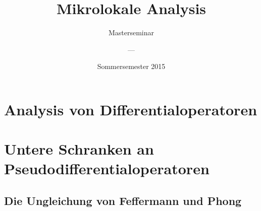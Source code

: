 \documentclass[11pt,bibtotoc]{scrbook}
\theoremstyle{definition}
\begin{document}
\titlehead{Priv.-Doz. Dr. Jens Wirth\\Institut f\"ur Analysis, Dynamik und Modellierung\\Universit\"at Stuttgart}
\lowertitleback{\copyright 2015. Texte geschrieben von den Teilnehmern des Seminars.  Einzelne Beiträge sind nicht namentlich gekennzeichnet. Ausarbeitungen basieren auf Originalliteratur. }
\title{Mikrolokale Analysis}
\subtitle{Masterseminar}
\author{---}
\date{Sommersemester 2015}
\maketitle
\tableofcontents
%
\part{Analysis von Differentialoperatoren}
%
%
%
\part{Untere Schranken an Pseudodifferentialoperatoren}
%

%
%

\chapter{Die Ungleichung von Feffermann und Phong}




\printindex
\end{document}
